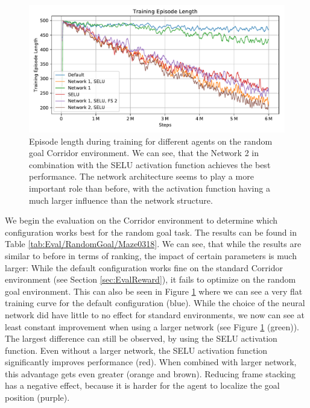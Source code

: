 \begin{figure}[htp]
    \begin{center}
        \includegraphics[clip, width=0.95\columnwidth]{figures/evaluation/randomness/goals/maze0318_episode_length.pdf}
    \end{center}
    \caption[Episode Length for Different Agents on the Random Goal Corridor Environment]{Episode length during training for different agents on the random goal Corridor environment. We can see, that the Network 2 in combination with the SELU activation function achieves the best performance. The network architecture seems to play a more important role than before, with the activation function having a much larger influence than the network structure.} \label{fig:Eval/RandomGoal/Maze0318}
\end{figure}

We begin the evaluation on the Corridor environment to determine which configuration works best for the random goal task. The results can be found in Table \ref{tab:Eval/RandomGoal/Maze0318}. We can see, that while the results are similar to before in terms of ranking, the impact of certain parameters is much larger: While the default configuration works fine on the standard Corridor environment (see Section \ref{sec:EvalReward}), it fails to optimize on the random goal environment. This can also be seen in Figure \ref{fig:Eval/RandomGoal/Maze0318} where we can see a very flat training curve for the default configuration (blue). While the choice of the neural network did have little to no effect for standard environments, we now can see at least constant improvement when using a larger network (see Figure \ref{fig:Eval/RandomGoal/Maze0318} (green)). The largest difference can still be observed, by using the SELU activation function. Even without a larger network, the SELU activation function significantly improves performance (red). When combined with larger network, this advantage gets even greater (orange and brown). Reducing frame stacking has a negative effect, because it is harder for the agent to localize the goal position (purple). 


